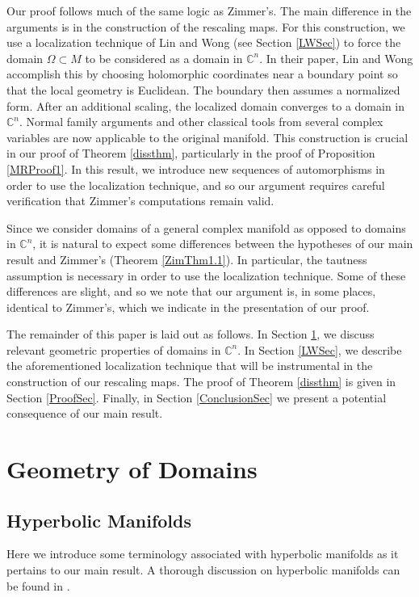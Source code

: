 \documentclass[12pt]{article}
\newcommand{\C}{\mathbb{C}}
\begin{document}
Our proof follows much of the same logic as Zimmer's. The main difference in the arguments is in the construction of the rescaling maps. For this construction, we use a localization technique of Lin and Wong \cite{LW} (see Section \ref{LWSec}) to force the domain $\Omega\subset M$ to be considered as a domain in $\C^n$. In their paper, Lin and Wong accomplish this by choosing holomorphic coordinates near a boundary point so that the local geometry is Euclidean. The boundary then assumes a normalized form. After an additional scaling, the localized domain converges to a domain in $\C^n$. Normal family arguments and other classical tools from several complex variables are now applicable to the original manifold. This construction is crucial in our proof of Theorem \ref{dissthm}, particularly in the proof of Proposition \ref{MRProof1}. In this result, we introduce new sequences of automorphisms in order to use the localization technique, and so our argument requires careful verification that Zimmer's computations remain valid. 

Since we consider domains of a general complex manifold as opposed to domains in $\C^n$, it is natural to expect some differences between the hypotheses of our main result and Zimmer's (Theorem \ref{ZimThm1.1}). In particular, the tautness assumption is necessary in order to use the localization technique. Some of these differences are slight, and so we note that our argument is, in some places, identical to Zimmer's, which we indicate in the presentation of our proof.

The remainder of this paper is laid out as follows. In Section \ref{GeoSec}, we discuss relevant geometric properties of domains in $\C^n$. In Section \ref{LWSec}, we describe the aforementioned localization technique \cite{LW} that will be instrumental in the construction of our rescaling maps. The proof of Theorem \ref{dissthm} is given in Section \ref{ProofSec}. Finally, in Section \ref{ConclusionSec} we present a potential consequence of our main result.


\section{Geometry of Domains}
\label{GeoSec}

\subsection{Hyperbolic Manifolds}
Here we introduce some terminology associated with hyperbolic manifolds as it pertains to our main result. A thorough discussion on hyperbolic manifolds can be found in \cite{KobayashiHyper}.
\end{document}
